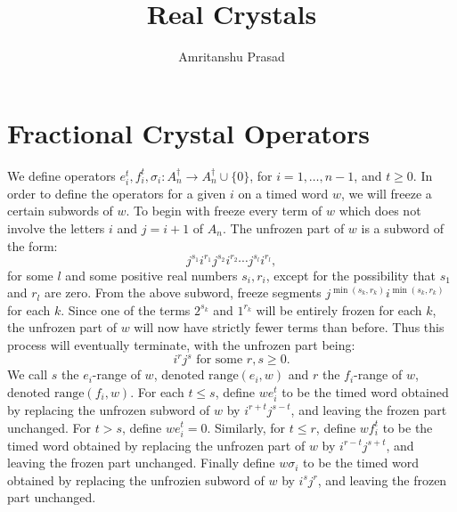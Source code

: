 \documentclass[12pt]{amsproc}
\title{Real Crystals}
\author{Amritanshu Prasad}
\newcommand{\range}{\mathrm{range}}
\theoremstyle{definition}
\begin{document}
\maketitle

\section{Fractional Crystal Operators}
\label{sec:frac-ops}
We define operators $e_i^t, f_i^t, \sigma_i:A_n^\dagger\to A_n^\dagger\cup \{0\}$, for $i=1,\dotsc,n-1$, and $t\geq 0$.
In order to define the operators for a given $i$ on a timed word $w$, we will freeze a certain subwords of $w$.
To begin with freeze every term of $w$ which does not involve the letters $i$ and $j=i+1$ of $A_n$.
The unfrozen part of $w$ is a subword of the form:
\begin{displaymath}
  j^{s_1}i^{r_1}j^{s_2}i^{r_2}\dotsb j^{s_l}i^{r_l},
\end{displaymath}
for some $l$ and some positive real numbers $s_i, r_i$, except for the possibility that $s_1$ and $r_l$ are zero.
From the above subword, freeze segments $j^{\min(s_k,r_k)}i^{\min(s_k,r_k)}$ for each $k$.
Since one of the terms $2^{s_k}$ and $1^{r_k}$ will be entirely frozen for each $k$, the unfrozen part of $w$ will now have strictly fewer terms than before.
Thus this process will eventually terminate, with the unfrozen part being:
\begin{displaymath}
  i^rj^s \text{ for some }r,s\geq 0.
\end{displaymath}
We call $s$ the $e_i$-range of $w$, denoted $\range(e_i,w)$ and $r$ the $f_i$-range of $w$, denoted $\range(f_i,w)$.
For each $t\leq s$, define $we_i^t$ to be the timed word obtained by replacing the unfrozen subword of $w$ by $i^{r+t}j^{s-t}$, and leaving the frozen part unchanged.
For $t>s$, define $we_i^t=0$.
Similarly, for $t\leq r$, define $wf_i^t$ to be the timed word obtained by replacing the unfrozen part of $w$ by $i^{r-t}j^{s+t}$, and leaving the frozen part unchanged.
Finally define $w\sigma_i$ to be the timed word obtained by replacing the unfrozien subword of $w$ by $i^sj^r$, and leaving the frozen part unchanged.
\end{document}
